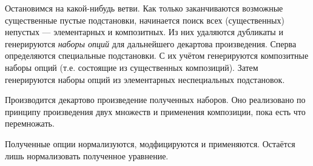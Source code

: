 \documentclass[12pt]{article}
\begin{document}
Остановимся на какой-нибудь ветви. Как только заканчиваются возможные
существенные пустые подстановки, начинается поиск всех (существенных)
непустых --- элементарных и композитных. Из них удаляются дубликаты и
генерируются \textit{наборы опций} для дальнейшего декартова произведения.
Сперва определяются специальные подстановки. С их учётом генерируются
композитные наборы опций (т.е. состоящие из существенных композиций). Затем
генерируются наборы опций из элементарных неспециальных подстановок.

Производится декартово произведение полученных наборов. Оно реализовано по
принципу произведения двух множеств и применения композиции, пока есть что
перемножать.

Полученные опции нормализуются, модфицируются и применяются. Остаётся
лишь нормализовать полученное уравнение.
\end{document}
